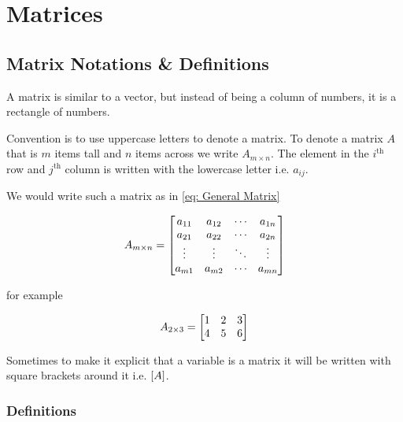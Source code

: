 \documentclass[main.tex]{subfiles}
\begin{document}
            \newpage

            \section{Matrices}
                \subsection{Matrix Notations \& Definitions}

                A matrix is similar to a vector, but instead of being a column of numbers, it is a rectangle of numbers.

                Convention is to use uppercase letters to denote a matrix. To denote a matrix $A$ that is $m$ items tall and $n$ items across we write $A_{m \times n}$. The element in the $i^{\text{th}}$ row and $j^{\text{th}}$ column is written with the lowercase letter i.e. $a_{ij}$.

                We would write such a matrix as in \eqref{eq: General Matrix}

                \begin{equation}
                    A_{m \times n} = \begin{bmatrix} a_{11} & a_{12} & \cdots & a_{1n}\\
                                            a_{21} & a_{22} & \cdots & a_{2n}\\
                                            \vdots & \vdots & \ddots & \vdots\\
                                            a_{m1} & a_{m2} & \cdots & a_{mn} \end{bmatrix}
                    \label{eq: General Matrix}
                \end{equation}

                for example

                \begin{equation*}
                    A_{2 \times 3} = \begin{bmatrix} 1 & 2 & 3\\
                                            4 & 5 & 6 \end{bmatrix}
                \end{equation*}

                Sometimes to make it explicit that a variable is a matrix it will be written with square brackets around it i.e. $\left[A\right]$.

                \subsubsection{Definitions}
\end{document}
